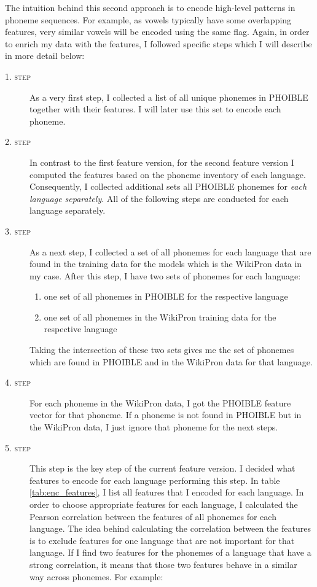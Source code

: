 The intuition behind this second approach is to encode high-level patterns in phoneme sequences. For example, as vowels typically have some overlapping features, very similar vowels will be encoded using the same flag. Again, in order to enrich my data with the features, I followed specific steps which I will describe in more detail below: 

\begin{description}
    \item[\textsc{1. step}] As a very first step, I collected a list of all unique phonemes in PHOIBLE together with their features. I will later use this set to encode each phoneme.
    \item[\textsc{2. step}] In contrast to the first feature version, for the second feature version I computed the features based on the phoneme inventory of each language. Consequently, I collected additional sets all PHOIBLE phonemes for \textit{each language separately}. All of the following steps are conducted for each language separately.
    \item[\textsc{3. step}] As a next step, I collected a set of all phonemes for each language that are found in the training data for the models which is the WikiPron data in my case. 
    After this step, I have two sets of phonemes for each language:
    \begin{enumerate}
    \item one set of all phonemes in PHOIBLE for the respective language
        \item one set of all phonemes in the WikiPron training data for the respective language
    \end{enumerate}
    Taking the intersection of these two sets gives me the set of phonemes which are found in PHOIBLE and in the WikiPron data for that language.
    \item[\textsc{4. step}] For each phoneme in the WikiPron data, I got the PHOIBLE feature vector for that phoneme. If a phoneme is not found in PHOIBLE but in the WikiPron data, I just ignore that phoneme for the next steps.
    \item[\textsc{5. step}] This step is the key step of the current feature version. I decided what features to encode for each language performing this step. In table \ref{tab:enc_features}, I list all features that I encoded for each language. In order to choose appropriate features for each language, I calculated the Pearson correlation between the features of all phonemes for each language. The idea behind calculating the correlation between the features is to exclude features for one language that are not important for that language. If I find two features for the phonemes of a language that have a strong correlation, it means that those two features behave in a similar way across phonemes. For example:
    

\end{description}

